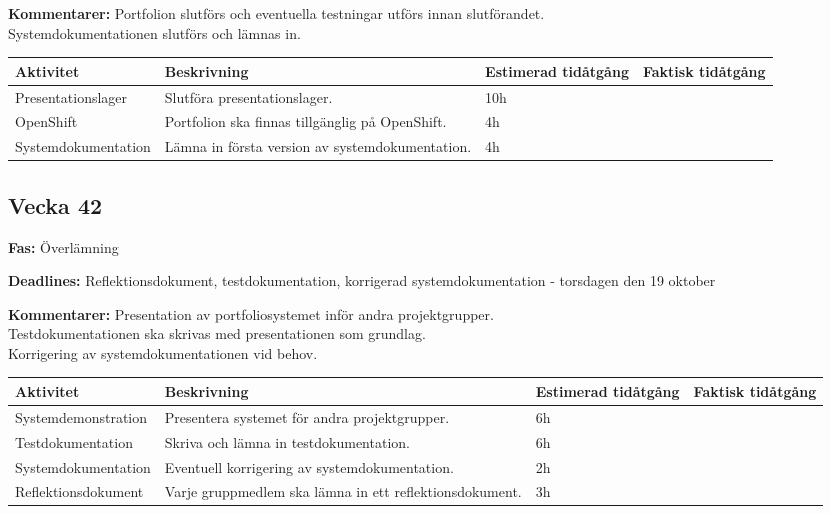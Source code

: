 \documentclass{TDP003mall}
\begin{document}
\textbf{Kommentarer:} Portfolion slutförs och eventuella testningar utförs innan slutförandet.\\
Systemdokumentationen slutförs och lämnas in.

\begin{table}[H]
\renewcommand{\arraystretch}{1.5}
\begin{tabularx}{\linewidth}{|l|X|l|l|}
\hline
\textbf{Aktivitet} & \textbf{Beskrivning} & \textbf{Estimerad tidåtgång} & \textbf{Faktisk tidåtgång}\\
\hline
Presentationslager & Slutföra presentationslager. & 10h & \\
\hline
OpenShift & Portfolion ska finnas tillgänglig på OpenShift. & 4h & \\
\hline
Systemdokumentation & Lämna in första version av systemdokumentation. & 4h & \\
\hline

\end{tabularx}
\end{table}

\subsection{Vecka 42}

\textbf{Fas:} Överlämning

\textbf{Deadlines:} Reflektionsdokument, testdokumentation, korrigerad systemdokumentation - torsdagen den 19 oktober

\textbf{Kommentarer:} Presentation av portfoliosystemet inför andra projektgrupper.\\
Testdokumentationen ska skrivas med presentationen som grundlag.\\
Korrigering av systemdokumentationen vid behov.

\begin{table}[H]
\renewcommand{\arraystretch}{1.5}
\begin{tabularx}{\linewidth}{|l|X|l|l|}
\hline
\textbf{Aktivitet} & \textbf{Beskrivning} & \textbf{Estimerad tidåtgång} & \textbf{Faktisk tidåtgång}\\
\hline
Systemdemonstration & Presentera systemet för andra projektgrupper. & 6h & \\
\hline
Testdokumentation & Skriva och lämna in testdokumentation. & 6h & \\
\hline
Systemdokumentation & Eventuell korrigering av systemdokumentation. & 2h & \\
\hline
Reflektionsdokument & Varje gruppmedlem ska lämna in ett reflektionsdokument. & 3h & \\
\hline

\end{tabularx}
\end{table}
\end{document}

